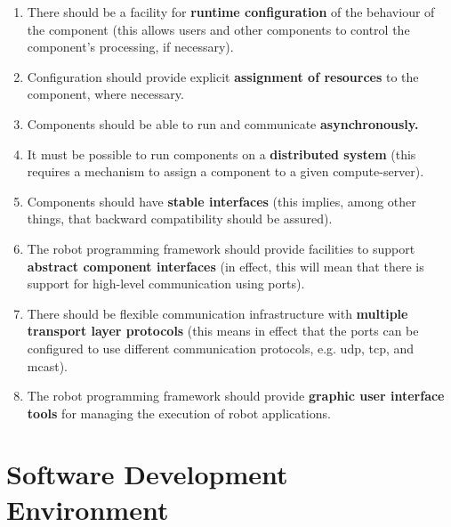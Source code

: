 \documentclass{CSSRforAfrica}
\begin{document}
\begin{enumerate}
\item There should be a facility for {\bf runtime configuration} of the behaviour of the component (this allows users and other components to control the component's processing, if necessary).

\item Configuration should provide explicit {\bf assignment of resources} to the component, where necessary.

\item Components should be able to run and communicate {\bf asynchronously.}

\item It must be possible to run components on a {\bf distributed system} (this requires a mechanism to assign a component to a given compute-server).

\item Components should have {\bf stable interfaces}  (this implies, among other things, that backward compatibility should be assured).

\item The robot programming framework should provide facilities to support {\bf abstract component interfaces} (in effect, this will mean that there is support for high-level communication using ports).

\item There should be flexible communication infrastructure with {\bf multiple transport layer protocols} (this means in effect that the ports can be configured to use different communication protocols, e.g. udp, tcp, and mcast).
 
\item The robot programming framework should provide {\bf graphic user interface tools}  for managing the execution of robot applications. 

\end{enumerate}


\newpage
\part{Software Development Environment}
\label{part:environment}
 
\setcounter{section}{0}      %
 
\end{document}
